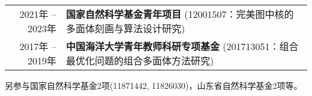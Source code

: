 %
%



 \begin{tabular}{rl}	
	2021年 -- 2023年  & \textbf{国家自然科学基金青年项目} (12001507：完美图中核的多面体刻画与算法设计研究)\\
	2017年 -- 2019年 	&  \textbf{中国海洋大学青年教师科研专项基金} (201713051：组合最优化问题的组合多面体方法研究)
\end{tabular}

另参与国家自然科学基金2项(11871442, 11826030)，山东省自然科学基金2项等。